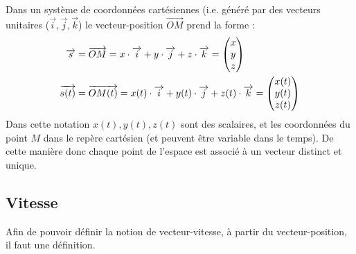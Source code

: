 \documentclass[11pt,a4paper]{article}
\begin{document}
\endgroup
\newpage
Dans un système de coordonnées cartésiennes (i.e. généré par des vecteurs unitaires ($\Vec{i}, \Vec{j}, \Vec{k}$) le vecteur-position $\overrightarrow{OM}$ prend la forme :
\begin{align*}
    \overrightarrow{s} &= \overrightarrow{OM} = x\cdot \overrightarrow{i} + y\cdot\overrightarrow{j} + z\cdot\overrightarrow{k} =  
    \begin{pmatrix} x \\ y \\ z \end{pmatrix} \\
    \overrightarrow{s(t)} &= \overrightarrow{OM(t)} = x(t)\cdot \overrightarrow{i} + y(t)\cdot\overrightarrow{j} + z(t)\cdot\overrightarrow{k} = 
    \begin{pmatrix} x(t) \\ y(t) \\ z(t) \end{pmatrix} \\
\end{align*}
Dans cette notation $x(t), y(t), z(t)$ sont des scalaires, et les coordonnées du point $M$ dans le repère cartésien (et peuvent être variable dans le temps). 
De cette manière donc chaque point de l'espace est associé à un vecteur distinct et unique. 

\subsection{Vitesse}
Afin de pouvoir définir la notion de vecteur-vitesse, à partir du vecteur-position, il faut une définition. 
\end{document}
